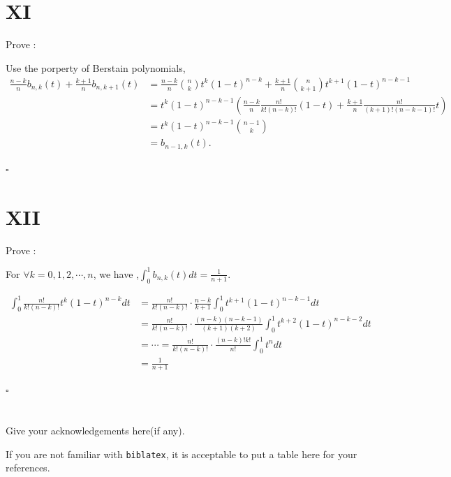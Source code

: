 \documentclass[a4paper]{article}
\begin{document}
\section*{XI}
Prove :

Use the porperty of Berstain polynomials,
\begin{align}
    \frac{n-k}{n}b_{n,k}(t)+\frac{k+1}{n}b_{n,k+1}(t) 
    &= \frac{n-k}{n}\binom{n}{k}t^{k}(1-t)^{n-k}+\frac{k+1}{n}\binom{n}{k+1}t^{k+1}(1-t)^{n-k-1}\\
    &=t^{k}(1-t)^{n-k-1}(\frac{n-k}{n}\frac{n!}{k!(n-k)!}(1-t)+\frac{k+1}{n}\frac{n!}{(k+1)!(n-k-1)!}t )\\
    &=t^{k}(1-t)^{n-k-1}\binom{n-1}{k}\\
    &=b_{n-1,k}(t).
\end{align}
\begin{flushright} 
    $\square$ 
\end{flushright} 

\section*{XII}
Prove :

For $\forall k  = 0,1,2,\cdots,n$, we have ,$\int _{0}^{1}b_{n,k}(t)dt=\frac{1}{n+1}$.

\begin{align}
    \int _{0}^{1}\frac{n!}{k!(n-k)!}t^{k}(1-t)^{n-k}dt&=\frac{n!}{k!(n-k)!}\cdot\frac{n-k}{k+1}\int _{0}^{1} t^{k+1}(1-t)^{n-k-1}dt\\
    &=\frac{n!}{k!(n-k)!}\cdot\frac{(n-k)(n-k-1)}{(k+1)(k+2)}\int _{0}^{1}t^{k+2}(1-t)^{n-k-2}dt\\
    &=\cdots=\frac{n!}{k!(n-k)!}\cdot\frac{(n-k)!k!}{n!}\int _{0}^{1} t^{n}dt\\
    &=\frac{1}{n+1}
\end{align}
\begin{flushright} 
    $\square$ 
\end{flushright} 


\section*{  }
Give your acknowledgements here(if any).


\printbibliography

If you are not familiar with \texttt{biblatex}, 
\cite{Zhang2020BooleanAO}
it is acceptable to put a table here for your references.
\end{document}

